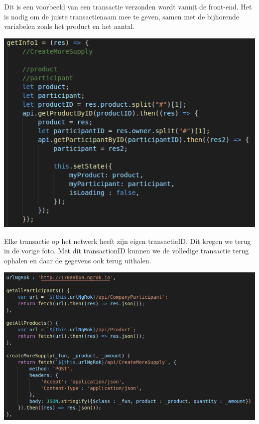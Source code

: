\documentclass[fleqn,a4paper,12pt]{book}
\begin{document}
Dit is een voorbeeld van een transactie verzonden wordt vanuit de front-end. Het is nodig om de juiste transactienaam mee te geven, samen met de bijhorende variabelen zoals het product en het aantal.

\begin{center}
	\includegraphics[width=14cm]{img/react-info}\\[1cm]
\end{center}

Elke transactie op het netwerk heeft zijn eigen transactieID. Dit kregen we terug in de vorige foto. Met dit transactionID kunnen we de volledige transactie terug ophalen en daar de gegevens ook terug uithalen.

\begin{center}
	\includegraphics[width=14cm]{img/react-api}\\[1cm]
\end{center}
\end{document}
